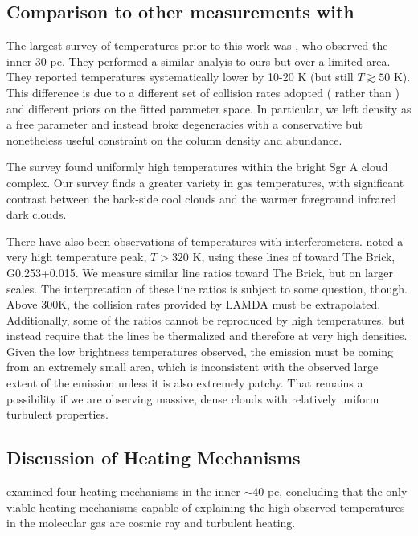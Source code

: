 \subsection{Comparison to other measurements with \para}
\label{sec:h2cocompare}
The largest survey of \para temperatures prior to this work was
\citet{Ao2013a}, who observed the inner 30 pc.  They performed a similar
analyis to ours but over a limited area.  They reported temperatures
systematically lower by 10-20 K (but still $T\gtrsim50$ K).  This difference is
due to a different set of collision rates adopted (\citet{Wiesenfeld2013a}
rather than \citet{Green1991a}) and different priors on the fitted parameter
space.  In particular, we left density as a free parameter and instead broke
degeneracies with a conservative but nonetheless useful constraint on the
column density and abundance.

The \citet{Ao2013a} survey found uniformly high temperatures within the bright
Sgr A cloud complex.  Our survey finds a greater variety in gas temperatures,
with significant contrast between the back-side cool clouds and the warmer
foreground infrared dark clouds.

There have also been observations of \para temperatures with interferometers.
\citet{Johnston2014a} noted a very high temperature peak, $T>320$ K, using these
lines of \para toward The Brick, G0.253+0.015.  We measure similar line
ratios toward The Brick, but on larger scales.  The interpretation of these
line ratios is subject to some question, though.  Above 300K, the collision
rates provided by LAMDA \citep{Green1991a,Schoier2005a,Wiesenfeld2013a} must be
extrapolated.  Additionally, some of the ratios cannot be reproduced by high
temperatures, but instead require that the lines be thermalized and therefore
at very high densities.   Given the low brightness temperatures observed,
the emission must be coming from an extremely small area, which is inconsistent
with the observed large extent of the emission unless it is also extremely
patchy.  That remains a possibility if we are observing massive, dense clouds
with relatively uniform turbulent properties.



\subsection{Discussion of Heating Mechanisms}
\citet{Ao2013a} examined four heating mechanisms in the inner $\sim 40$ pc,
concluding that the only viable heating mechanisms capable of explaining the
high observed temperatures in the molecular gas are cosmic ray and turbulent
heating.  


